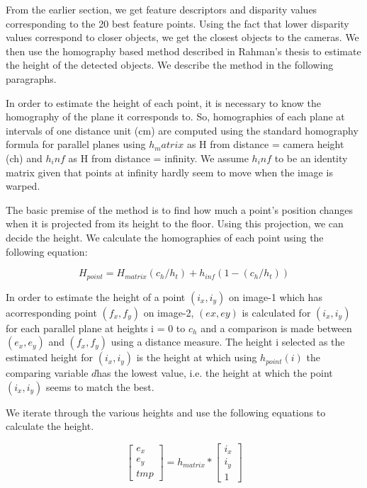 \documentclass[11pt]{report}
\begin{document}
From the earlier section, we get feature descriptors and disparity values corresponding to the 20 best feature points. Using the fact that lower disparity values correspond to closer objects, we get the closest objects to the cameras. We then use the homography based method described in Rahman's thesis\cite{obstacleavoidance} to estimate the height of the detected objects. We describe the method in the following paragraphs.

In order to estimate the height of each point, it is necessary to know the homography of the plane it corresponds to. So, homographies of each plane at intervals of one distance unit (cm) are computed using the standard homography formula for parallel planes using $h_matrix$ as H from distance = camera height (ch) and $h_inf$ as H from distance = infinity. We assume $h_inf$ to be an identity matrix given that points at infinity hardly seem to move when the image is warped. 

The basic premise of the method is to find how much a point's position changes when it is projected from its height to the floor. Using this projection, we can decide the height. We calculate the homographies of each point using the following equation:

\begin{equation}
H_{point} = H_{matrix}(c_h/h_t) + h_{inf}(1-(c_h/h_t))
\end{equation}
 

In order to estimate the height of a point $(i_x,i_y)$ on image-1 which has acorresponding point $(f_x,f_y)$ on image-2, $(ex,ey)$ is calculated for $(i_x,i_y)$ for each parallel plane at heights i = 0 to $c_h$ and a comparison is made between $(e_x,e_y)$ and $(f_x,f_y)$ using a distance measure. The height i selected as the estimated height for $(i_x,i_y)$ is the height at which using $h_{point}(i)$ the comparing variable $d$has the lowest value, i.e. the height at which the point $(i_x,i_y)$ seems to match the best.

We iterate through the various heights and use the following equations to calculate the height. 

\begin{equation}
\begin{bmatrix}
e_x \\ e_y \\ tmp 
\end{bmatrix}
= h_{matrix} * \begin{bmatrix}
i_x \\ i_y \\ 1
\end{bmatrix}
\end{equation} 
\end{document}
